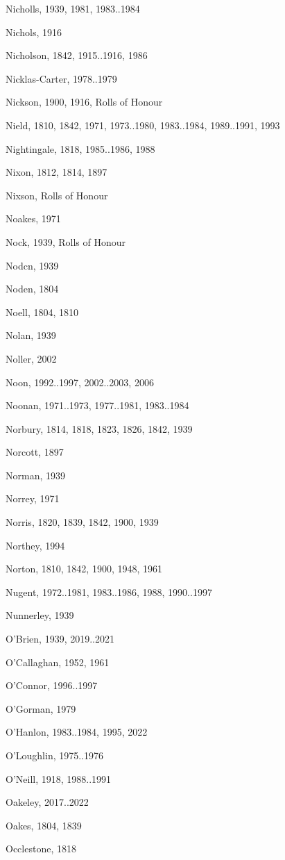 {\begin{theindex}
\item Nicholls, 1939, 1981, 1983..1984
\item Nichols, 1916
\item Nicholson, 1842, 1915..1916, 1986
\item Nicklas-Carter, 1978..1979
\item Nickson, 1900, 1916, Rolls of Honour
\item Nield, 1810, 1842, 1971, 1973..1980, 1983..1984, 1989..1991, 1993
\item Nightingale, 1818, 1985..1986, 1988
\item Nixon, 1812, 1814, 1897
\item Nixson, Rolls of Honour
\item Noakes, 1971
\item Nock, 1939, Rolls of Honour
\item Nodcn, 1939
\item Noden, 1804
\item Noell, 1804, 1810
\item Nolan, 1939
\item Noller, 2002
\item Noon, 1992..1997, 2002..2003, 2006
\item Noonan, 1971..1973, 1977..1981, 1983..1984
\item Norbury, 1814, 1818, 1823, 1826, 1842, 1939
\item Norcott, 1897
\item Norman, 1939
\item Norrey, 1971
\item Norris, 1820, 1839, 1842, 1900, 1939
\item Northey, 1994
\item Norton, 1810, 1842, 1900, 1948, 1961
\item Nugent, 1972..1981, 1983..1986, 1988, 1990..1997
\item Nunnerley, 1939
\item O'Brien, 1939, 2019..2021
\item O'Callaghan, 1952, 1961
\item O'Connor, 1996..1997
\item O'Gorman, 1979
\item O'Hanlon, 1983..1984, 1995, 2022
\item O'Loughlin, 1975..1976
\item O'Neill, 1918, 1988..1991
\item Oakeley, 2017..2022
\item Oakes, 1804, 1839
\item Occlestone, 1818

\end{theindex}}
